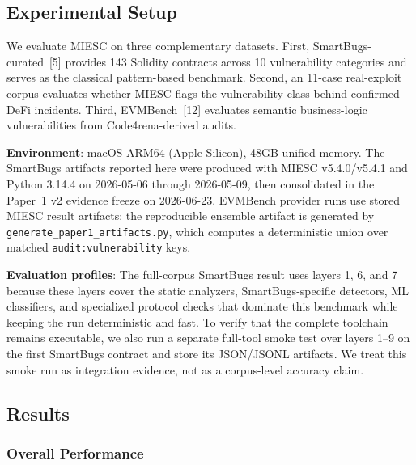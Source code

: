 \documentclass[conference]{IEEEtran}
\begin{document}
\subsection{Experimental Setup}

We evaluate MIESC on three complementary datasets. First, SmartBugs-curated~[5] provides 143 Solidity contracts across 10 vulnerability categories and serves as the classical pattern-based benchmark. Second, an 11-case real-exploit corpus evaluates whether MIESC flags the vulnerability class behind confirmed DeFi incidents. Third, EVMBench~[12] evaluates semantic business-logic vulnerabilities from Code4rena-derived audits.

\textbf{Environment}: macOS ARM64 (Apple Silicon), 48GB unified memory. The SmartBugs artifacts reported here were produced with MIESC v5.4.0/v5.4.1 and Python 3.14.4 on 2026-05-06 through 2026-05-09, then consolidated in the Paper~1 v2 evidence freeze on 2026-06-23. EVMBench provider runs use stored MIESC result artifacts; the reproducible ensemble artifact is generated by \texttt{generate\_paper1\_artifacts.py}, which computes a deterministic union over matched \texttt{audit:vulnerability} keys.

\textbf{Evaluation profiles}: The full-corpus SmartBugs result uses layers 1, 6, and 7 because these layers cover the static analyzers, SmartBugs-specific detectors, ML classifiers, and specialized protocol checks that dominate this benchmark while keeping the run deterministic and fast. To verify that the complete toolchain remains executable, we also run a separate full-tool smoke test over layers 1--9 on the first SmartBugs contract and store its JSON/JSONL artifacts. We treat this smoke run as integration evidence, not as a corpus-level accuracy claim.

\subsection{Results}

\subsubsection{Overall Performance}
\end{document}
